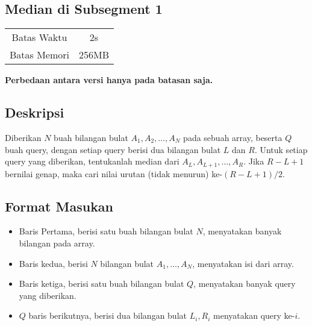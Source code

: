 \documentclass{article}
\begin{document}
\begin{center}
    \section*{Median di Subsegment 1} %

    \begin{tabular}{ | c c | }
        \hline
        Batas Waktu  & 2s \\    %
        Batas Memori & 256MB \\  %
        \hline
    \end{tabular}
\end{center}

\begin{center}
    \textbf{Perbedaan antara versi hanya pada batasan saja.}
\end{center}

\subsection*{Deskripsi}

Diberikan $N$ buah bilangan bulat $A_1, A_2, \dots, A_N$ pada sebuah array, beserta $Q$ buah query, dengan setiap query berisi dua bilangan bulat $L$ dan $R$. Untuk setiap query yang diberikan, tentukanlah median dari $A_L, A_{L + 1}, \dots, A_R$. Jika $R - L + 1$ bernilai genap, maka cari nilai urutan (tidak menurun) ke-$(R - L + 1) / 2$.

\subsection*{Format Masukan}
\begin{itemize}
\item{Baris Pertama, berisi satu buah bilangan bulat $N$, menyatakan banyak bilangan pada array.}

\item{Baris kedua, berisi $N$ bilangan bulat $A_1, \dots, A_N$, menyatakan isi dari array.}

\item{Baris ketiga, berisi satu buah bilangan bulat $Q$, menyatakan banyak query yang diberikan.}

\item{$Q$ baris berikutnya, berisi dua bilangan bulat $L_i, R_i$ menyatakan query ke-$i$.}

\end{itemize}
\end{document}
